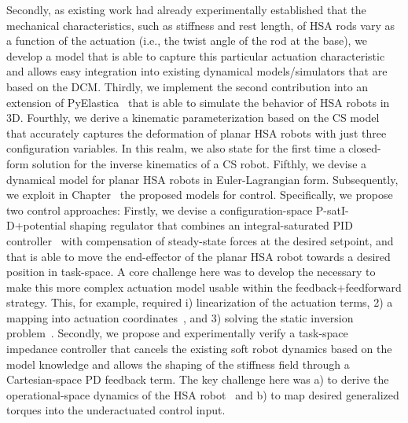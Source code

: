 Secondly, as existing work had already experimentally established that the mechanical characteristics, such as stiffness and rest length, of \gls{HSA} rods vary as a function of the actuation (i.e., the twist angle of the rod at the base), we develop a model that is able to capture this particular actuation characteristic and allows easy integration into existing dynamical models/simulators that are based on the \gls{DCM}.
Thirdly, we implement the second contribution into an extension of PyElastica~\cite{naughton2021elastica} that is able to simulate the behavior of \gls{HSA} robots in 3D.
Fourthly, we derive a kinematic parameterization based on the \gls{CS} model that accurately captures the deformation of planar \gls{HSA} robots with just three configuration variables. In this realm, we also state for the first time a closed-form solution for the inverse kinematics of a \gls{CS} robot.
Fifthly, we devise a dynamical model for planar \gls{HSA} robots in Euler-Lagrangian form.
Subsequently, we exploit in Chapter~\circled{\ref{chp:hsacontrol}} the proposed models for control. Specifically, we propose two control approaches:
Firstly, we devise a configuration-space P-satI-D+potential shaping regulator that combines an integral-saturated PID controller~\cite{pustina2022p} with compensation of steady-state forces at the desired setpoint, and that is able to move the end-effector of the planar \gls{HSA} robot towards a desired position in task-space.
A core challenge here was to develop the necessary to make this more complex actuation model usable within the feedback+feedforward strategy. This, for example, required i) linearization of the actuation terms, 2) a mapping into actuation coordinates~\cite{pustina2024input}, and 3) solving the static inversion problem~\cite{della2025pushing}.
Secondly, we propose and experimentally verify a task-space impedance controller that cancels the existing soft robot dynamics based on the model knowledge and allows the shaping of the stiffness field through a Cartesian-space PD feedback term. The key challenge here was a) to derive the operational-space dynamics of the \gls{HSA} robot~\cite{khatib1987unified, della2020model} and b) to map desired generalized torques into the underactuated control input.


